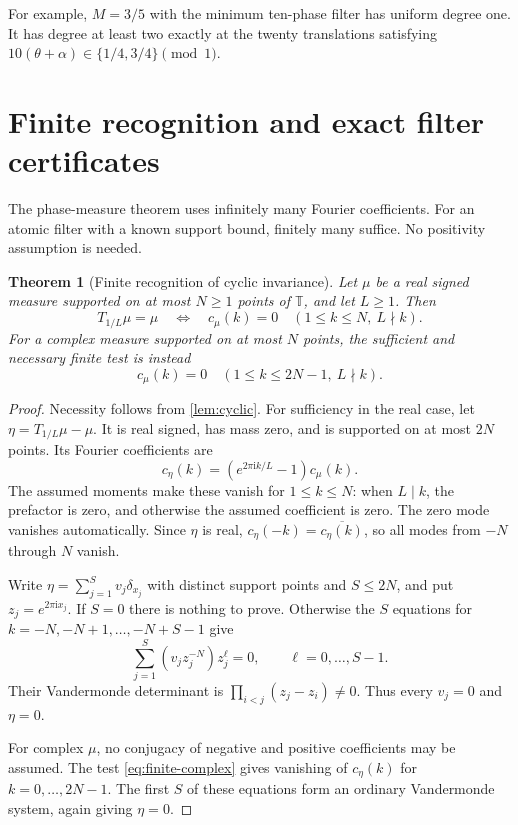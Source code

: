\documentclass[11pt,a4paper]{article}
\numberwithin{equation}{section}
\theoremstyle{plain}
\newtheorem{theorem}{Theorem}[section]
\theoremstyle{definition}
\theoremstyle{remark}
\newcommand{\T}{\mathbb T}
\newcommand{\ii}{\mathrm i}
\begin{document}
For example, $M=3/5$ with the minimum ten-phase filter has uniform degree
one. It has degree at least two exactly at the twenty translations
satisfying $10(\theta+\alpha)\in\{1/4,3/4\}\pmod1$.

\section{Finite recognition and exact filter certificates}
\label{sec:certificates}

The phase-measure theorem uses infinitely many Fourier coefficients.
For an atomic filter with a known support bound, finitely many suffice.
No positivity assumption is needed.

\begin{theorem}[Finite recognition of cyclic invariance]\label{thm:finite-recognition}
Let $\mu$ be a real signed measure supported on at most $N\ge1$ points
of $\T$, and let $L\ge1$. Then
\begin{equation}\label{eq:finite-real}
 T_{1/L}\mu=\mu
 \quad\Longleftrightarrow\quad
 c_\mu(k)=0\quad(1\le k\le N,\ L\nmid k).
\end{equation}
For a complex measure supported on at most $N$ points, the sufficient
and necessary finite test is instead
\begin{equation}\label{eq:finite-complex}
 c_\mu(k)=0\quad(1\le k\le2N-1,\ L\nmid k).
\end{equation}
\end{theorem}
\begin{proof}
Necessity follows from \cref{lem:cyclic}. For sufficiency in the real case,
let $\eta=T_{1/L}\mu-\mu$. It is real signed, has mass zero, and is
supported on at most $2N$ points. Its Fourier coefficients are
\[
 c_\eta(k)=(e^{2\pi\ii k/L}-1)c_\mu(k).
\]
The assumed moments make these vanish for $1\le k\le N$: when
$L\mid k$, the prefactor is zero, and otherwise the assumed coefficient
is zero. The zero mode vanishes automatically. Since $\eta$ is real,
$c_\eta(-k)=\overline{c_\eta(k)}$, so all modes from $-N$ through $N$
vanish.

Write $\eta=\sum_{j=1}^{S}v_j\delta_{x_j}$ with distinct support points
and $S\le2N$, and put $z_j=e^{2\pi\ii x_j}$. If $S=0$ there is nothing
to prove. Otherwise the $S$ equations for
$k=-N,-N+1,\ldots,-N+S-1$ give
\[
 \sum_{j=1}^{S}(v_jz_j^{-N})z_j^{\ell}=0,
 \qquad \ell=0,\ldots,S-1.
\]
Their Vandermonde determinant is
$\prod_{i<j}(z_j-z_i)\ne0$. Thus every $v_j=0$ and $\eta=0$.

For complex $\mu$, no conjugacy of negative and positive coefficients
may be assumed. The test \eqref{eq:finite-complex} gives vanishing of
$c_\eta(k)$ for $k=0,\ldots,2N-1$. The first $S$ of these equations
form an ordinary Vandermonde system, again giving $\eta=0$.
\end{proof}
\end{document}
